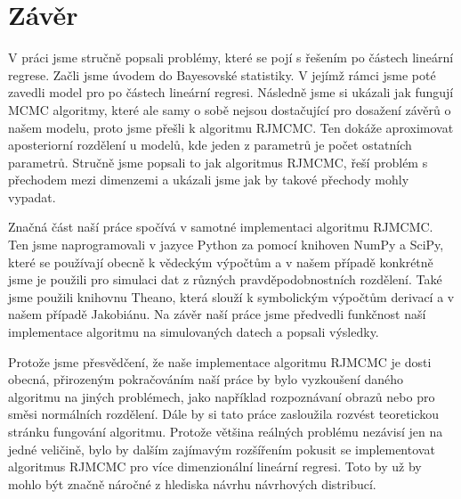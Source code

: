\documentclass[czech,master,public,dept470,male,cpdeclaration,oneside, python]{diploma}
\begin{document}
\section{Závěr}
V práci jsme stručně popsali problémy, které se pojí s řešením po částech lineární regrese. Začli jsme úvodem do Bayesovské statistiky. V jejímž rámci jsme poté zavedli model pro po částech lineární regresi. Následně jsme si ukázali jak fungují MCMC algoritmy, které ale samy o sobě nejsou dostačující pro dosažení závěrů o našem modelu, proto jsme přešli k algoritmu RJMCMC. Ten dokáže aproximovat aposteriorní rozdělení u modelů, kde jeden z parametrů je počet ostatních parametrů. Stručně jsme popsali to jak algoritmus RJMCMC, řeší problém s přechodem mezi dimenzemi a ukázali jsme jak by takové přechody mohly vypadat. \par
Značná část naší práce spočívá v samotné implementaci algoritmu RJMCMC. Ten jsme naprogramovali v jazyce Python za pomocí knihoven NumPy a SciPy, které se používají obecně k vědeckým výpočtům a v našem případě konkrétně jsme je použili pro simulaci dat z různých pravděpodobnostních rozdělení. Také jsme použili knihovnu Theano, která slouží k symbolickým výpočtům derivací a v našem případě Jakobiánu. Na závěr naší práce jsme předvedli funkčnost naší implementace algoritmu na simulovaných datech a popsali výsledky. \par
Protože jsme přesvědčení, že naše implementace algoritmu RJMCMC je dosti obecná, přirozeným pokračováním naší práce by bylo vyzkoušení daného algoritmu na jiných problémech, jako například rozpoznávaní obrazů nebo pro směsi normálních rozdělení. Dále by si tato práce zasloužila rozvést teoretickou stránku fungování algoritmu. Protože většina reálných problému nezávisí jen na jedné veličině, bylo by dalším zajímavým rozšířením pokusit se implementovat algoritmus RJMCMC pro více dimenzionální lineární regresi. Toto by už by mohlo být značně náročné z hlediska návrhu návrhových distribucí. 




\appendix
\end{document}

